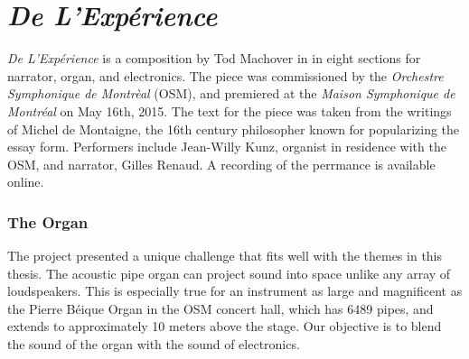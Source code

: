 \clearpage
\chapter{\textit{De L'Exp\'{e}rience}}
\label{ch:experience}

\textit{De L'Exp\'{e}rience} is a composition by Tod Machover in in
eight sections for narrator, organ, and electronics. The piece was
commissioned by the \textit{Orchestre Symphonique de Montr\`{e}al}
(OSM), and premiered at the \textit{Maison Symphonique de
  Montr\'{e}al} on May 16th, 2015. The text for the piece was taken
from the writings of Michel de Montaigne, the 16th century philosopher
known for popularizing the essay form.  Performers include Jean-Willy
Kunz, organist in residence with the OSM, and narrator, Gilles
Renaud. A recording of the perrmance is available
online.


\subsection{The Organ}
\label{sec:organ}
The project presented a unique challenge that fits well with the
themes in this thesis. The acoustic pipe organ can project sound into
space unlike any array of loudspeakers. This is especially true for an
instrument as large and magnificent as the Pierre B\'{e}ique Organ in
the OSM concert hall, which has 6489 pipes, and extends to
approximately 10 meters above the stage. Our objective is to blend
the sound of the organ with the sound of electronics. 

